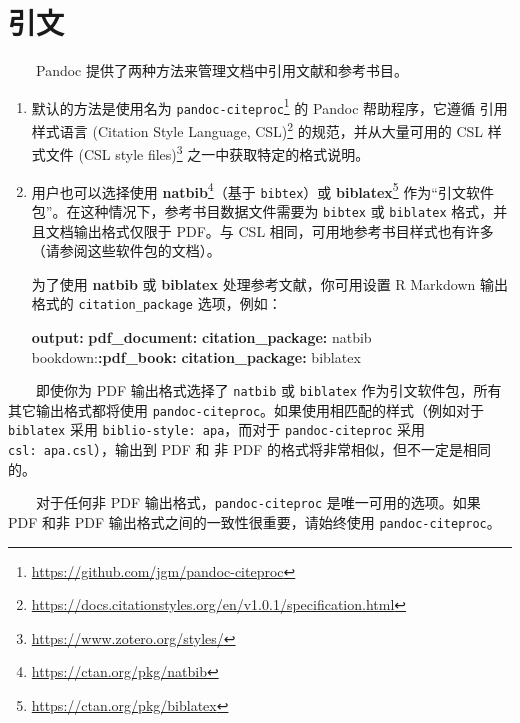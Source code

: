 \documentclass[
  12pt,
]{krantz}
\newenvironment{Shaded}{\begin{snugshade}}{\end{snugshade}}
\newcommand{\AttributeTok}[1]{\textcolor[rgb]{0.13,0.29,0.53}{#1}}
\newcommand{\FunctionTok}[1]{\textcolor[rgb]{0.13,0.29,0.53}{\textbf{#1}}}
\newcommand{\KeywordTok}[1]{\textcolor[rgb]{0.13,0.29,0.53}{\textbf{#1}}}
\renewcommand{\href}[2]{#2\footnote{\url{#1}}}
\theoremstyle{definition}
\theoremstyle{definition}
\theoremstyle{definition}
\theoremstyle{definition}
\theoremstyle{remark}
\begin{document}
\hypertarget{citations}{%
\section{引文}\label{citations}}

  Pandoc 提供了两种方法来管理文档中引用文献和参考书目。

\begin{enumerate}
\def\labelenumi{\arabic{enumi}.}
\item
  默认的方法是使用名为 \href{https://github.com/jgm/pandoc-citeproc}{\texttt{pandoc-citeproc}} 的 Pandoc 帮助程序，它遵循 \href{https://docs.citationstyles.org/en/v1.0.1/specification.html}{引用样式语言 (Citation Style Language, CSL)} 的规范，并从大量可用的 \href{https://www.zotero.org/styles/}{CSL 样式文件 (CSL style files)} 之一中获取特定的格式说明。
\item
  用户也可以选择使用 \href{https://ctan.org/pkg/natbib}{\textbf{natbib}}（基于 \texttt{bibtex}）或 \href{https://ctan.org/pkg/biblatex}{\textbf{biblatex}} 作为``引文软件包''。在这种情况下，参考书目数据文件需要为 \texttt{bibtex} 或 \texttt{biblatex} 格式，并且文档输出格式仅限于 PDF。与 CSL 相同，可用地参考书目样式也有许多（请参阅这些软件包的文档）。

  为了使用 \textbf{natbib} 或 \textbf{biblatex} 处理参考文献，你可用设置 R Markdown 输出格式的 \texttt{citation\_package} 选项，例如：

\begin{Shaded}
\begin{Highlighting}[]
\FunctionTok{output}\KeywordTok{:}
\AttributeTok{  }\FunctionTok{pdf\_document}\KeywordTok{:}
\AttributeTok{    }\FunctionTok{citation\_package}\KeywordTok{:}\AttributeTok{ natbib}
\AttributeTok{  bookdown:}\FunctionTok{:pdf\_book}\KeywordTok{:}
\AttributeTok{    }\FunctionTok{citation\_package}\KeywordTok{:}\AttributeTok{ biblatex}
\end{Highlighting}
\end{Shaded}
\end{enumerate}

  即使你为 PDF 输出格式选择了 \texttt{natbib} 或 \texttt{biblatex} 作为引文软件包，所有其它输出格式都将使用 \texttt{pandoc-citeproc}。如果使用相匹配的样式（例如对于 \texttt{biblatex} 采用 \texttt{biblio-style:\ apa}，而对于 \texttt{pandoc-citeproc} 采用 \texttt{csl:\ apa.csl}），输出到 PDF 和 非 PDF 的格式将非常相似，但不一定是相同的。

  对于任何非 PDF 输出格式，\texttt{pandoc-citeproc} 是唯一可用的选项。如果 PDF 和非 PDF 输出格式之间的一致性很重要，请始终使用 \texttt{pandoc-citeproc}。
\end{document}
